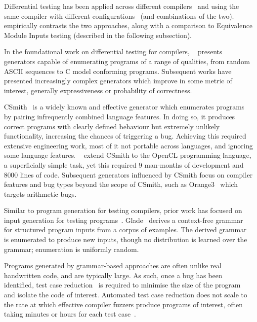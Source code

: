 Differential testing has been applied across different compilers~\cite{Chen2016b,Lidbury2015a} and using the same compiler with different configurations~\cite{Kyle2015b,Paka2011} (and combinations of the two). \citeauthor{Chen2014a}~\cite{Chen2014a} empirically contrasts the two approaches, along with a comparison to Equivalence Module Inputs testing (described in the following subsection).

In the foundational work on differential testing for compilers, \citeauthor{McKeeman1998}~\cite{McKeeman1998} presents generators capable of enumerating programs of a range of qualities, from random ASCII sequences to C model conforming programs. Subsequent works have presented increasingly complex generators which improve in some metric of interest, generally expressiveness or probability of correctness.

CSmith~\cite{Yang2011} is a widely known and effective generator which enumerates programs by pairing infrequently combined language features. In doing so, it produces correct programs with clearly defined behaviour but extremely unlikely functionality, increasing the chances of triggering a bug. Achieving this required extensive engineering work, most of it not portable across languages, and ignoring some language features. \citeauthor{Lidbury2015a}~\cite{Lidbury2015a} extend CSmith to the OpenCL programming language, a superficially simple task, yet this required 9 man-months of development and 8000 lines of code. Subsequent generators influenced by CSmith focus on compiler features and bug types beyond the scope of CSmith, such as Orange3~\cite{Nagai2013} which targets arithmetic bugs.

Similar to program generation for testing compilers, prior work has focused on input generation for testing programs~\cite{Godefroid2005,Claessen2014,Duregard2012,Fetscher2015a,Runciman2008}. Glade~\cite{Bastani2017} derives a context-free grammar for structured program inputs from a corpus of examples. The derived grammar is enumerated to produce new inputs, though no distribution is learned over the grammar; enumeration is uniformly random.

Programs generated by grammar-based approaches are often unlike real handwritten code, and are typically large. As such, once a bug has been identified, test case reduction~\cite{Regehr2012a} is required to minimise the size of the program and isolate the code of interest. Automated test case reduction does not scale to the rate at which effective compiler fuzzers produce programs of interest, often taking minutes or hours for each test case~\cite{Pflanzer2016}.

